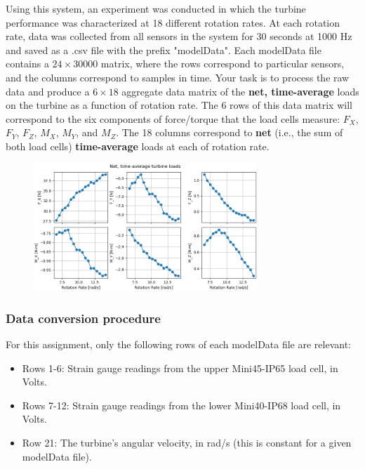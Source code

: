 \documentclass{homework}
\begin{document}
Using this system, an experiment was conducted in which the turbine performance was characterized at 18 different rotation rates. At each rotation rate, data was collected from all sensors in the system for 30 seconds at 1000 Hz and saved as a .csv file with the prefix "modelData". Each modelData file contains a $24\!\times\!30000$ matrix, where the rows correspond to particular sensors, and the columns correspond to samples in time. Your task is to process the raw data and produce a $6\times18$ aggregate data matrix of the \textbf{net, time-average} loads on the turbine as a function of rotation rate. The 6 rows of this data matrix will correspond to the six components of force/torque that the load cells measure: $F_X$, $F_Y$, $F_Z$, $M_X$, $M_Y$, and $M_Z$. The 18 columns correspond to \textbf{net} (i.e., the sum of both load cells) \textbf{time-average} loads at each of rotation rate.

\begin{figure}[h]
    \centering
    \includegraphics[width=0.75\textwidth]{exampleOutput.png}
\end{figure}

\newpage
\subsubsection*{Data conversion procedure}
For this assignment, only the following rows of each modelData file are relevant: 
\begin{itemize}
    \itemsep0em 
    \item[] Rows 1-6: Strain gauge readings from the upper Mini45-IP65 load cell, in Volts.
    \item[] Rows 7-12: Strain gauge readings from the lower Mini40-IP68 load cell, in Volts.
    \item[] Row 21: The turbine's angular velocity, in rad/s (this is constant for a given modelData file).
\end{itemize}
\end{document}
